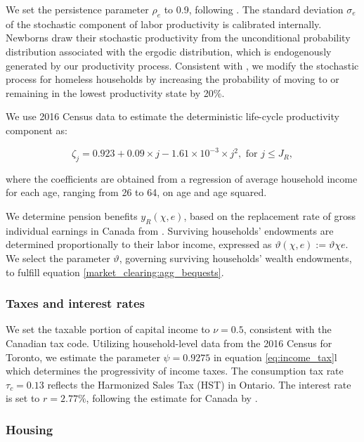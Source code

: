 \documentclass[parskip=full]{article}
\begin{document}
\noindent We set the persistence parameter $\rho_{e}$ to 0.9, following \citet{gkkoc}. The standard deviation $\sigma_{e}$ of the stochastic component of labor productivity is calibrated internally. Newborns draw their stochastic productivity from the unconditional probability distribution associated with the ergodic distribution, which is endogenously generated by our productivity process. Consistent with \citet{az-2024}, we modify the stochastic process for homeless households by increasing the probability of moving to or remaining in the lowest productivity state by 20\%.  

We use 2016 Census data to estimate the deterministic life-cycle productivity component as:

\begin{equation*}
\zeta_j = 0.923+0.09\times j-1.61\times 10^{-3}\times j^{2}, \mbox{ for } j\leq J_{R},
\end{equation*}

\noindent where the coefficients are obtained from a regression of average household income for each age, ranging from 26 to 64, on age and age squared. 

We determine pension benefits ${y_{R}(\chi,e)}$, based on the replacement rate of gross individual earnings in Canada from \citet{OECD-pension}. Surviving households' endowments are determined proportionally to their labor income, expressed as $\vartheta(\chi,e):=\vartheta \chi e$. We select the parameter $\vartheta$, governing surviving households' wealth endowments, to fulfill equation \eqref{market_clearing:agg_bequests}.

\subsubsection{Taxes and interest rates}

We set the taxable portion of capital income to $\nu=0.5$, consistent with the Canadian tax code. Utilizing household-level data from the 2016 Census for Toronto, we estimate the parameter $\psi=0.9275$ in equation \eqref{eq:income_tax}l which determines the progressivity of income taxes. The consumption tax rate $\tau_{c}=0.13$ reflects the Harmonized Sales Tax (HST) in Ontario. The interest rate is set to $r=2.77\%$, following the estimate for Canada by \citet{bruneau-etal-2018}.

\subsubsection{Housing}
\end{document}
